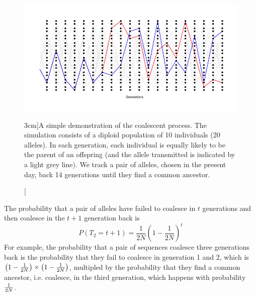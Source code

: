 \begin{figure}
\begin{center}
\includegraphics[width=\textwidth]{figures/Coalescent.png}
\end{center}
\caption[][3cm]{A simple demonstration of the coalescent process. The simulation
  consists of a diploid population of 10 individuals (20 alleles). In
  each generation, each individual is equally likely to be the parent
  of an offspring (and the allele transmitted is indicated by a light
  grey line).  We track a
  pair of alleles, chosen in the present day, back 14 generations
  until they find a common ancestor.  } \label{fig:Coalescent_simulation}  %
\end{figure}

The probability that a pair of alleles
have failed to coalesce in $t$ generations and then coalesce in the
$t+1$ generation back is
\begin{equation}
 P(T_2=t+1) = \frac{1}{2N} \left(1- \frac{1}{2N} \right)^{t} \label{eqn:coal_time_dist}
\end{equation}
For example, the probability that a pair of sequences coalesce three generations back is the probability that they fail to coalesce in generation 1 and 2, which is $ \left(1- \nicefrac{1}{2N} \right) \times \left(1- \nicefrac{1}{2N} \right)$, multipled by the probability that they find a common ancestor, i.e. coalesce, in the third generation, which happens with probability $\nicefrac{1}{2N}$. 

